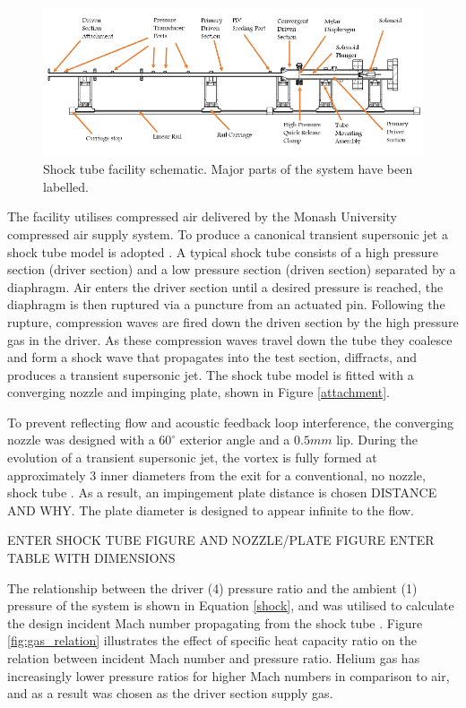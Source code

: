 \begin{figure}[H] 
	\centering
	\includegraphics[width=1.05\textwidth]{fig9.PNG} 
	\caption{Shock tube facility schematic. Major parts of the
		system have been labelled.}
	\label{fig:shocktube}
\end{figure}	

The facility utilises compressed air delivered by the Monash University compressed air supply system. To produce a canonical transient supersonic jet a shock tube model is adopted \cite{john1962shock}. A typical shock tube consists of a high pressure section (driver section) and a low pressure section (driven section) separated by a diaphragm. Air enters the driver section until a desired pressure is reached, the diaphragm is then ruptured via a puncture from an actuated pin. Following the rupture, compression waves are fired down the driven section by the high pressure gas in the driver. As these compression waves travel down the tube they coalesce and form a shock wave that propagates into the test section, diffracts, and produces a transient supersonic jet. The shock tube model is fitted with a converging nozzle and impinging plate, shown in Figure \ref{attachment}. 

To prevent reflecting flow and acoustic feedback loop interference, the converging nozzle was designed with a $60^\circ$ exterior angle and a $0.5mm$ lip. During the evolution of a transient supersonic jet, the vortex is fully formed at approximately 3 inner diameters from the exit for a conventional, no nozzle, shock tube \cite{mariani2013head}. As a result, an impingement plate distance is chosen DISTANCE AND WHY. The plate diameter is designed to appear infinite to the flow.

ENTER SHOCK TUBE FIGURE AND NOZZLE/PLATE FIGURE
ENTER TABLE WITH DIMENSIONS

The relationship between the driver (4) pressure ratio and the ambient (1) pressure of the system is shown in Equation \ref{shock}, and was utilised to calculate the design incident Mach number propagating from the shock tube \cite{anderson2010fundamentals}. Figure \ref{fig:gas_relation} illustrates the effect of specific heat capacity ratio on the relation between incident Mach number and pressure ratio. Helium gas has increasingly lower pressure ratios for higher Mach numbers in comparison to air, and as a result was chosen as the driver section supply gas.

